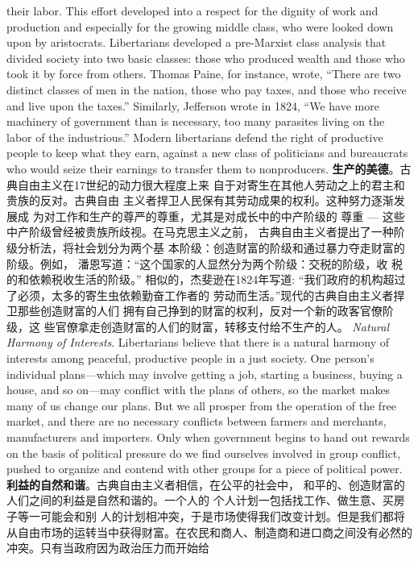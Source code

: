 \begin{paracol}{2}
their labor. This effort developed into a respect for the dignity
of work and production and especially for the growing middle
class, who were looked down upon by aristocrats. Libertarians
developed a pre-Marxist class analysis that divided society into
two basic classes: those who produced wealth and those who
took it by force from others. Thomas Paine, for instance, wrote,
``There are two distinct classes of men in the nation, those who
pay taxes, and those who receive and live upon the taxes.'' Similarly, Jefferson wrote in 1824, ``We have more machinery of
government than is necessary, too many parasites living on the
labor of the industrious.'' Modern libertarians defend the right
of productive people to keep what they earn, against a new class
of politicians and bureaucrats who would seize their earnings to
transfer them to nonproducers.
\switchcolumn
\textbf{生产的美德}。古典自由主义在17世纪的动力很大程度上来
自于对寄生在其他人劳动之上的君主和贵族的反对。古典自由
主义者捍卫人民保有其劳动成果的权利。这种努力逐渐发展成
为对工作和生产的尊严的尊重，尤其是对成长中的中产阶级的
尊重 --- 这些中产阶级曾经被贵族所歧视。在马克思主义之前，
古典自由主义者提出了一种阶级分析法，将社会划分为两个基
本阶级：创造财富的阶级和通过暴力夺走财富的阶级。例如，
潘恩写道：“这个国家的人显然分为两个阶级：交税的阶级，收
税的和依赖税收生活的阶级。” 相似的，杰斐逊在1824年写道:
“我们政府的机构超过了必须，太多的寄生虫依赖勤奋工作者的
劳动而生活。”现代的古典自由主义者捍卫那些创造财富的人们
拥有自己挣到的财富的权利，反对一个新的政客官僚阶级，这
些官僚拿走创造财富的人们的财富，转移支付给不生产的人。
\switchcolumn*
\textit{Natural Harmony of Interests}. Libertarians believe that there is a
natural harmony of interests among peaceful, productive people in a just society. One person's individual plans---which may
involve getting a job, starting a business, buying a house, and
so on---may conflict with the plans of others, so the market
makes many of us change our plans. But we all prosper from
the operation of the free market, and there are no necessary
conflicts between farmers and merchants, manufacturers and
importers. Only when government begins to hand out rewards
on the basis of political pressure do we find ourselves involved
in group conflict, pushed to organize and contend with other
groups for a piece of political power.
\switchcolumn
\textbf{利益的自然和谐}。古典自由主义者相信，在公平的社会中，
和平的、创造财富的人们之间的利益是自然和谐的。一个人的
个人计划一包括找工作、做生意、买房子等一可能会和别
人的计划相冲突，于是市场使得我们改变计划。但是我们都将
从自由市场的运转当中获得财富。在农民和商人、制造商和进口商之间没有必然的冲突。只有当政府因为政治压力而开始给

\end{paracol}
